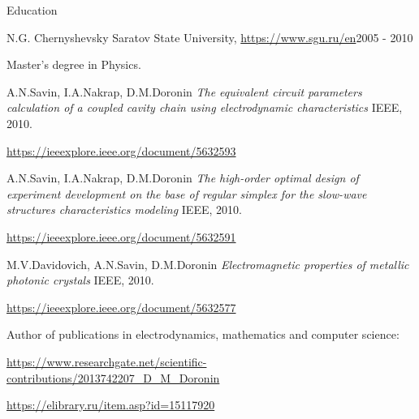 \documentclass{resume}
\begin{document}

\begin{rSection}{Education}

\begin{rSubsection}{N.G. Chernyshevsky Saratov State University, \url{https://www.sgu.ru/en}}{2005 - 2010}{}{}

Master's degree in Physics.

\begin{thebibliography}{1}
    A.N.Savin, I.A.Nakrap, D.M.Doronin
    \textit{The equivalent circuit parameters calculation of a coupled cavity chain using electrodynamic characteristics}
    IEEE, 2010.

    \url{https://ieeexplore.ieee.org/document/5632593}

    A.N.Savin, I.A.Nakrap, D.M.Doronin
    \textit{The high-order optimal design of experiment development on the base of regular simplex for the slow-wave structures characteristics modeling}
    IEEE, 2010.

    \url{https://ieeexplore.ieee.org/document/5632591}


    M.V.Davidovich, A.N.Savin, D.M.Doronin
    \textit{Electromagnetic properties of metallic photonic crystals}
    IEEE, 2010.

    \url{https://ieeexplore.ieee.org/document/5632577}

\end{thebibliography}

Author of publications in electrodynamics, mathematics and computer science:
\item \url{https://www.researchgate.net/scientific-contributions/2013742207_D_M_Doronin}
\item \url{https://elibrary.ru/item.asp?id=15117920}

\end{rSubsection}
\end{rSection}
\end{document}
